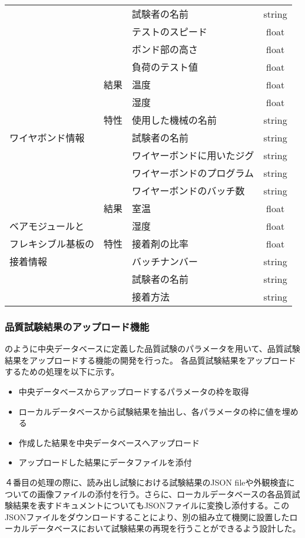 \begin{table}[tbp]
\begin{center}
\begin{tabular}{|l||c|l|c|}
      &  & 試験者の名前 & string \\
      &  & テストのスピード & float \\
      &  & ボンド部の高さ & float \\
      &  & 負荷のテスト値 & float \\
    \hline
      \multirow{7}{*}{ワイヤボンド情報}
      & 結果 & 温度 & float \\
      &  & 湿度 & float \\
    \cline{2-4}
      & 特性 & 使用した機械の名前 & string \\
      &  & 試験者の名前 & string \\
      &  & ワイヤーボンドに用いたジグ & string \\
      &  & ワイヤーボンドのプログラム & string \\
      &  & ワイヤーボンドのバッチ数 & string \\
    \hline
      & 結果 & 室温 & float \\
      ベアモジュールと &  & 湿度 & float \\
    \cline{2-4}
      フレキシブル基板の& 特性 & 接着剤の比率 & float \\
      接着情報&  & バッチナンバー & string \\
      &  & 試験者の名前 & string \\
      &  & 接着方法 & string \\
    \hline
    \end{tabular}
  \end{center}
\end{table}


\subsubsection{品質試験結果のアップロード機能}

のように中央データベースに定義した品質試験のパラメータを用いて、品質試験結果をアップロードする機能の開発を行った。
各品質試験結果をアップロードするための処理を以下に示す。
\begin{itemize}
  \item[1. ] 中央データベースからアップロードするパラメータの枠を取得
  \item[2. ] ローカルデータベースから試験結果を抽出し、各パラメータの枠に値を埋める
  \item[3. ] 作成した結果を中央データベースへアップロード
  \item[4. ] アップロードした結果にデータファイルを添付
\end{itemize}
４番目の処理の際に、読み出し試験における試験結果のJSON fileや外観検査についての画像ファイルの添付を行う。さらに、ローカルデータベースの各品質試験結果を表すドキュメントについてもJSONファイルに変換し添付する。このJSONファイルをダウンロードすることにより、別の組み立て機関に設置したローカルデータベースにおいて試験結果の再現を行うことができるよう設計した。

